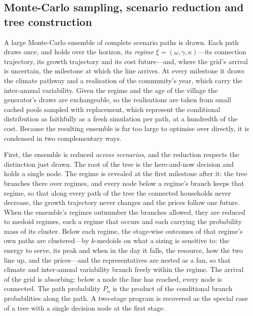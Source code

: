 \documentclass[11pt,a4paper]{article}
\theoremstyle{plain}
\theoremstyle{definition}
\begin{document}
\subsection{Monte-Carlo sampling, scenario reduction and tree construction}
\label{sec:tree}

A large Monte-Carlo ensemble of complete scenario paths is drawn. Each path draws once, and
holds over the horizon, its \emph{regime} $\xi=(\omega,\gamma,\kappa)$---its connection
trajectory, its growth trajectory and its cost future---and, where the grid's arrival is
uncertain, the milestone at which the line arrives. At every milestone it draws the climate
pathway and a realisation of the community's year, which carry the inter-annual
variability. Given the regime and the age of the village the generator's draws are
exchangeable, so the realisations are taken from small cached pools sampled with
replacement, which represent the conditional distribution as faithfully as a fresh
simulation per path, at a hundredth of the cost. Because the resulting ensemble is far too
large to optimise over directly, it is condensed in two complementary ways.

First, the ensemble is reduced \emph{across scenarios}, and the reduction respects the
distinction just drawn. The root of the tree is the here-and-now decision and holds a single
node. The regime is revealed at the first milestone after it: the tree branches there over
regimes, and every node below a regime's branch keeps that regime, so that along every path
of the tree the connected households never decrease, the growth trajectory never changes and
the prices follow one future. When the ensemble's regimes outnumber the branches allowed,
they are reduced to medoid regimes, each a regime that occurs and each carrying the
probability mass of its cluster. Below each regime, the stage-wise outcomes of that regime's
own paths are clustered---by $k$-medoids on what a sizing is sensitive to: the energy to
serve, its peak and when in the day it falls, the resource, how the two line up, and the
prices---and the representatives are nested as a fan, so that climate and inter-annual
variability branch freely within the regime. The arrival of the grid is absorbing: below a
node the line has reached, every node is connected. The path probability $P_n$ is the
product of the conditional branch probabilities along the path. A two-stage program is
recovered as the special case of a tree with a single decision node at the first stage.
\end{document}
